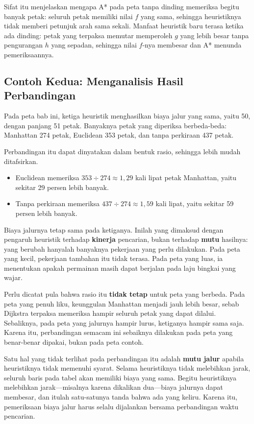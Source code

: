 Sifat itu menjelaskan mengapa A* pada peta tanpa dinding memeriksa begitu
banyak petak: seluruh petak memiliki nilai $f$ yang sama, sehingga heuristiknya
tidak memberi petunjuk arah sama sekali. Manfaat heuristik baru terasa ketika
ada dinding: petak yang terpaksa memutar memperoleh $g$ yang lebih besar tanpa
pengurangan $h$ yang sepadan, sehingga nilai $f$-nya membesar dan A* menunda
pemeriksaannya.

\subsection{Contoh Kedua: Menganalisis Hasil Perbandingan}

\begin{contohbox}
Pada peta bab ini, ketiga heuristik menghasilkan biaya jalur yang sama, yaitu
50, dengan panjang 51 petak. Banyaknya petak yang diperiksa berbeda-beda:
Manhattan 274 petak, Euclidean 353 petak, dan tanpa perkiraan 437 petak.
\end{contohbox}

Perbandingan itu dapat dinyatakan dalam bentuk rasio, sehingga lebih mudah
ditafsirkan.

\begin{itemize}
  \item Euclidean memeriksa $353 \div 274 \approx 1{,}29$ kali lipat petak
        Manhattan, yaitu sekitar 29 persen lebih banyak.
  \item Tanpa perkiraan memeriksa $437 \div 274 \approx 1{,}59$ kali lipat,
        yaitu sekitar 59 persen lebih banyak.
\end{itemize}

Biaya jalurnya tetap sama pada ketiganya. Inilah yang dimaksud
dengan pengaruh heuristik terhadap \textbf{kinerja} pencarian, bukan terhadap
\textbf{mutu} hasilnya: yang berubah hanyalah banyaknya pekerjaan yang perlu
dilakukan. Pada peta yang kecil, pekerjaan tambahan itu tidak terasa. Pada peta
yang luas, ia menentukan apakah permainan masih dapat berjalan pada laju
bingkai yang wajar.

Perlu dicatat pula bahwa rasio itu \textbf{tidak tetap} untuk peta yang
berbeda. Pada peta yang penuh liku, keunggulan Manhattan menjadi jauh lebih
besar, sebab Dijkstra terpaksa memeriksa hampir seluruh petak yang dapat
dilalui. Sebaliknya, pada peta yang jalurnya hampir lurus, ketiganya hampir
sama saja. Karena itu, perbandingan semacam ini sebaiknya dilakukan pada peta
yang benar-benar dipakai, bukan pada peta contoh.

\begin{catatabox}
Satu hal yang tidak terlihat pada perbandingan itu adalah \textbf{mutu jalur}
apabila heuristiknya tidak memenuhi syarat. Selama heuristiknya tidak
melebihkan jarak, seluruh baris pada tabel akan memiliki biaya yang sama. Begitu
heuristiknya melebihkan jarak---misalnya karena dikalikan dua---biaya jalurnya
dapat membesar, dan itulah satu-satunya tanda bahwa ada yang keliru. Karena itu,
pemeriksaan biaya jalur harus selalu dijalankan bersama perbandingan waktu
pencarian.
\end{catatabox}
